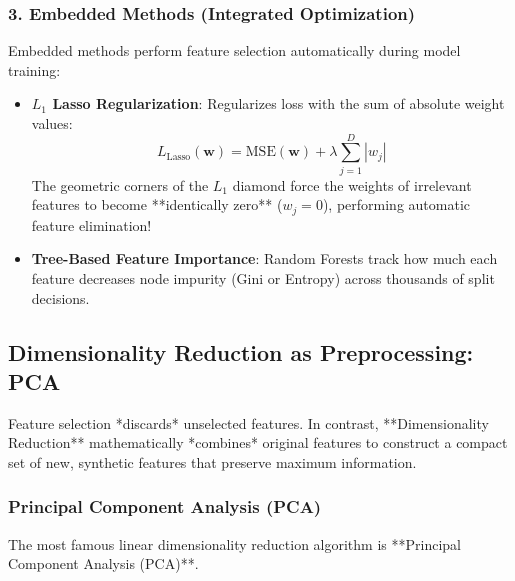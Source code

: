 \subsubsection{3. Embedded Methods (Integrated Optimization)}
Embedded methods perform feature selection automatically during model training:
\begin{itemize}
    \item \textbf{$L_1$ Lasso Regularization}: Regularizes loss with the sum of absolute weight values:
    \begin{equation}
    L_{\text{Lasso}}(\mathbf{w}) = \text{MSE}(\mathbf{w}) + \lambda \sum_{j=1}^{D} |w_j|\label{eq:lasso_loss}
    \end{equation}
    The geometric corners of the $L_1$ diamond force the weights of irrelevant features to become **identically zero** ($w_j = 0$), performing automatic feature elimination!
    \item \textbf{Tree-Based Feature Importance}: Random Forests track how much each feature decreases node impurity (Gini or Entropy) across thousands of split decisions.
\end{itemize}

\subsection{Dimensionality Reduction as Preprocessing: PCA}\label{subsec:feature_pca}

Feature selection *discards* unselected features. In contrast, **Dimensionality Reduction** mathematically *combines* original features to construct a compact set of new, synthetic features that preserve maximum information.

\subsubsection{Principal Component Analysis (PCA)}
The most famous linear dimensionality reduction algorithm is **Principal Component Analysis (PCA)**. 

